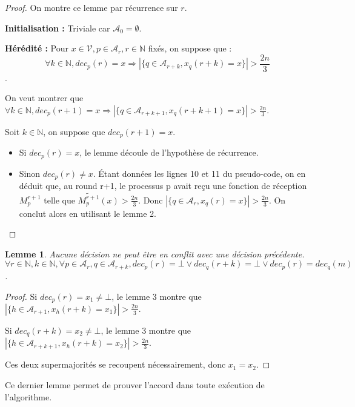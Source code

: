 \documentclass{article}
\newtheorem{lemma}{Lemme}
\begin{document}
\begin{proof}

On montre ce lemme par récurrence sur $r$.

\textbf{Initialisation :}
	Triviale car $\mathcal{A}_0 = \emptyset$.

\textbf{Hérédité :}
	Pour $x \in \mathcal{V}, p \in \mathcal{A}_r, r \in \mathds{N}$ fixés, on suppose que :
	$$ \forall k \in \mathds{N}, dec_p(r) = x \Rightarrow| \{ q \in \mathcal{A}_{r+k} , x_q(r+k) = x \} | > \frac{2 n}{3}$$.

	On veut montrer que 
	$ \forall k \in \mathds{N}, dec_p(r+1) = x \Rightarrow| \{ q \in \mathcal{A}_{r+k+1} , x_q(r+k+1) = x \} | > \frac{2 n}{3}$.

	Soit $k \in \mathds{N}$, on suppose que $dec_p(r+1) = x$.

	\begin{itemize}

		\item Si $dec_p(r) = x$, le lemme découle de l'hypothèse de récurrence.
		\item Sinon $dec_p(r) \neq x$. Étant données les lignes 10 et 11 du pseudo-code,
			on en déduit que, au round r+1, le processus p avait reçu une fonction de réception $M_p^{r+1}$ telle que $\widetilde{M_p^{r+1}}(x) > \frac{2 n}{3}$.
			Donc $| \{ q \in \mathcal{A}_r , x_q(r) = x \} | > \frac{2 n}{3}$.
			On conclut alors en utilisant le lemme 2.

	\end{itemize}
\end{proof}

\begin{lemma}
	Aucune décision ne peut être en conflit avec une décision précédente.
	$$ \forall r \in \mathds{N}, k \in \mathds{N}, \forall p \in \mathcal{A}_r, q \in \mathcal{A}_{r+k},dec_p(r) = \bot \vee dec_q(r+k) = \bot \vee dec_p(r) = dec_q(m)$$.
\end{lemma}
\begin{proof}

	Si $dec_p(r) = x_1 \neq \bot$,   le lemme 3 montre que $|\{h \in \mathcal{A}_{r+1}, x_h(r+k) = x_1\}| > \frac{2 n}{3}$.

	Si $dec_q(r+k) = x_2 \neq \bot$,   le lemme 3 montre que $|\{h \in \mathcal{A}_{r+k+1}, x_h(r+k) = x_2\}|> \frac{2 n}{3}$.

Ces deux supermajorités se recoupent nécessairement, donc $x_1 = x_2$.
\end{proof}

Ce dernier lemme permet de prouver l'accord dans toute exécution de l'algorithme.
\end{document}
